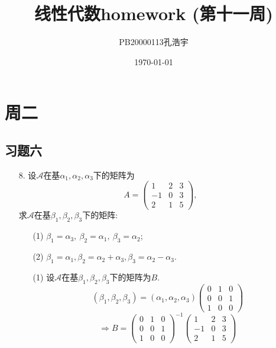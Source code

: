 \documentclass{article}
\title{线性代数homework (第十一周)}
\author{PB20000113孔浩宇}
\date{\today}
\begin{document}
\maketitle
\section{周二}
\subsection{习题六}
\begin{enumerate}
    \item [8.]设$\mathcal{A}$在基$\alpha_1,\alpha_2,\alpha_3$下的矩阵为
    \[
        A=\begin{pmatrix}
            1 & 2 & 3\\
            -1 & 0 & 3\\
            2 & 1 & 5
        \end{pmatrix},
    \]
    求$\mathcal{A}$在基$\beta_1,\beta_2,\beta_3$下的矩阵:
    \begin{enumerate}
        \item [(1)]$\beta_1=\alpha_3,\ \beta_2=\alpha_1,\ \beta_3=\alpha_2$;
        \item [(2)]$\beta_1=\alpha_1,\beta_2=\alpha_2+\alpha_3,\beta_3=\alpha_2-\alpha_3$.
    \end{enumerate}
    \begin{enumerate}
        \item [(1)]设$\mathcal{A}$在基$\beta_1,\beta_2,\beta_3$下的矩阵为$B$.
        \[
            (\beta_1,\beta_2,\beta_3)=(\alpha_1,\alpha_2,\alpha_3)
            \begin{pmatrix}
                0 & 1 & 0\\
                0 & 0 & 1\\
                1 & 0 & 0
            \end{pmatrix}
        \]
        \[
            \Rightarrow
            B=
            {\begin{pmatrix}
                0 & 1 & 0\\
                0 & 0 & 1\\
                1 & 0 & 0
            \end{pmatrix}}^{-1}
            \begin{pmatrix}
                1 & 2 & 3\\
                -1 & 0 & 3\\
                2 & 1 & 5
            \end{pmatrix}
\]
\end{enumerate}
\end{enumerate}
\end{document}
